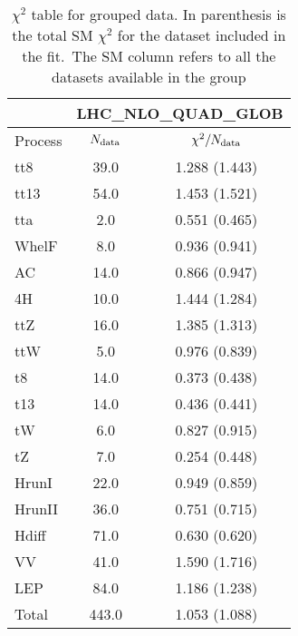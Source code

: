 \documentclass{article}
\begin{document}
\begin{table}[H]
\centering
\begin{tabular}{|l|c|c|}
\hline
& \multicolumn{2}{c|}{LHC_NLO_QUAD_GLOB}\\ \hline
Process  & $N_{\rm data}$ & $\chi^2/N_{\rm data}$\\ \hline
tt8 & 39.0                         & 1.288                             (1.443) \\ \hline
tt13 & 54.0                         & 1.453                             (1.521) \\ \hline
tta & 2.0                         & 0.551                             (0.465) \\ \hline
WhelF & 8.0                         & 0.936                             (0.941) \\ \hline
AC & 14.0                         & 0.866                             (0.947) \\ \hline
4H & 10.0                         & 1.444                             (1.284) \\ \hline
ttZ & 16.0                         & 1.385                             (1.313) \\ \hline
ttW & 5.0                         & 0.976                             (0.839) \\ \hline
t8 & 14.0                         & 0.373                             (0.438) \\ \hline
t13 & 14.0                         & 0.436                             (0.441) \\ \hline
tW & 6.0                         & 0.827                             (0.915) \\ \hline
tZ & 7.0                         & 0.254                             (0.448) \\ \hline
HrunI & 22.0                         & 0.949                             (0.859) \\ \hline
HrunII & 36.0                         & 0.751                             (0.715) \\ \hline
Hdiff & 71.0                         & 0.630                             (0.620) \\ \hline
VV & 41.0                         & 1.590                             (1.716) \\ \hline
LEP & 84.0                         & 1.186                             (1.238) \\ \hline
 \hline Total & 443.0                 & 1.053                     (1.088) \\ \hline
\end{tabular}
\caption{$\chi^2$ table for grouped data. In parenthesis is the total SM $\chi^2$ for the dataset included in the fit.\
                    The SM column refers to all the datasets available in the group}
\end{table}
\end{document}

